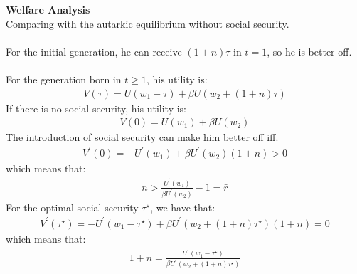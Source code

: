 \documentclass{article}
\begin{document}
\textbf{Welfare Analysis}\\
Comparing with the autarkic equilibrium without social security.\\\\
For the initial generation, he can receive $(1 + n)\tau$ in $t = 1$, so he is better off.\\\\
For the generation born in $t \geq 1$, his utility is:
	\begin{align*}
		V(\tau) = U(w_1 - \tau) + \beta U(w_2 + (1 + n)\tau)
	\end{align*}
If there is no social security, his utility is:
	\begin{align*}
		V(0) = U(w_1) + \beta U(w_2)
	\end{align*}
The introduction of social security can make him better off iff.
	\begin{align*}
		V^\prime(0) = -U^\prime(w_1) + \beta U^\prime(w_2)(1 + n) > 0
	\end{align*}
which means that:
	\begin{align*}
		n > \frac{U^\prime(w_1)}{\beta U^\prime(w_2)} - 1 = \bar{r}
	\end{align*}
For the optimal social security $\tau^\star$, we have that:
	\begin{align*}
		V^\prime(\tau^\star) = -U^\prime(w_1 - \tau^\star) + \beta U^\prime(w_2 + (1 +n)\tau^\star)(1 + n) = 0
	\end{align*}
which means that:
	\begin{align*}
		1 + n = \frac{U^\prime(w_1 - \tau^\star)}{\beta U^\prime(w_2 + (1 + n)\tau^\star)}
	\end{align*}
\end{document}
